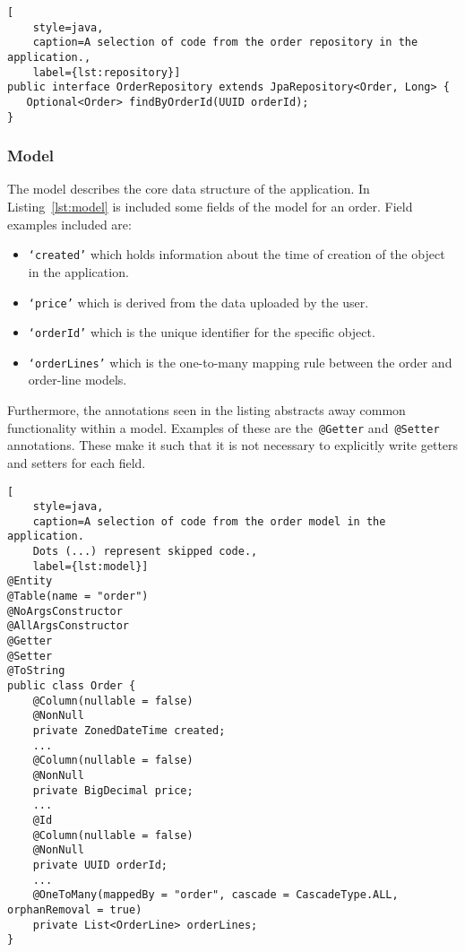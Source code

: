 \begin{lstlisting}[
    style=java,
    caption=A selection of code from the order repository in the application.,
    label={lst:repository}]
public interface OrderRepository extends JpaRepository<Order, Long> {
   Optional<Order> findByOrderId(UUID orderId);
}
\end{lstlisting}

\subsubsection{Model}

The model describes the core data structure of the application.
In Listing~\ref{lst:model} is included some fields of the model for an order.
Field examples included are:

\begin{itemize}
    \item \texttt{`created'} which holds information about the time of creation of the object in the application.
    \item \texttt{`price'} which is derived from the data uploaded by the user.
    \item \texttt{`orderId'} which is the unique identifier for the specific object.
    \item \texttt{`orderLines'} which is the one-to-many mapping rule between the order and order-line models.
\end{itemize}

Furthermore, the annotations seen in the listing abstracts away common functionality within a model.
Examples of these are the~\texttt{@Getter} and~\texttt{@Setter} annotations.
These make it such that it is not necessary to explicitly write getters and setters for each field.

\begin{lstlisting}[
    style=java,
    caption=A selection of code from the order model in the application.
    Dots (...) represent skipped code.,
    label={lst:model}]
@Entity
@Table(name = "order")
@NoArgsConstructor
@AllArgsConstructor
@Getter
@Setter
@ToString
public class Order {
    @Column(nullable = false)
    @NonNull
    private ZonedDateTime created;
    ...
    @Column(nullable = false)
    @NonNull
    private BigDecimal price;
    ...
    @Id
    @Column(nullable = false)
    @NonNull
    private UUID orderId;
    ...
    @OneToMany(mappedBy = "order", cascade = CascadeType.ALL, orphanRemoval = true)
    private List<OrderLine> orderLines;
}
\end{lstlisting}

